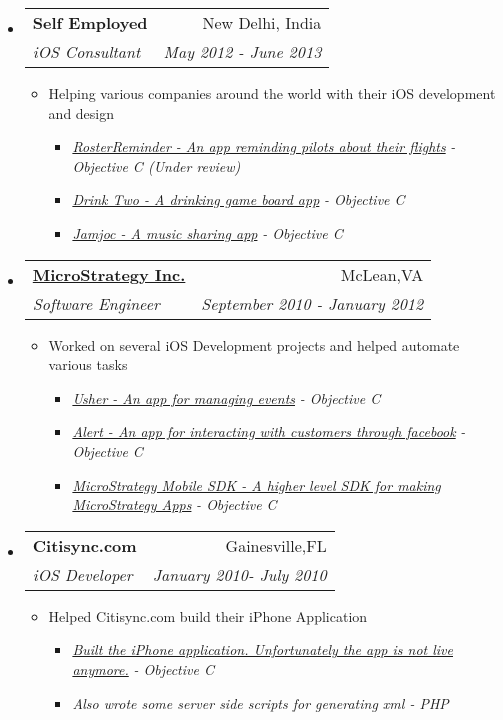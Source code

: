 \documentclass[letterpaper,11pt]{article}
\makeatletter
\newcommand{\resitem}[1]{\item #1 \vspace{-2pt}}
\newcommand{\ressubheading}[4]{
\begin{tabular*}{7.0in}{l@{\extracolsep{\fill}}r}
		\textbf{#1} & #2 \\
		\textit{#3} & \textit{#4} \\
\end{tabular*}\vspace{-6pt}}
\makeatother
\begin{document}
\begin{itemize}
\item
    \ressubheading{{Self Employed}}{New Delhi, India}{iOS Consultant}{May 2012 - June 2013}
    \begin{itemize}
        \resitem{Helping various companies around the world with their iOS development and design}
        \begin{itemize}
           \resitem{\href{https://itunes.apple.com/us/app/sg-pilots-roster-reminder/id561001503}{\emph{RosterReminder - An app reminding pilots about their flights}}\emph{ - Objective C (Under review)}}
            \resitem{\href{https://itunes.apple.com/tr/app/drink-two-college-party-drinking/id590014833?mt=8}{\emph{Drink Two - A drinking game board app}}\emph{ - Objective C }}
            \resitem{\href{https://itunes.apple.com/us/app/earhead/id585869906?mt=8}{\emph{Jamjoc - A music sharing app}}\emph{ - Objective C }}
        \end{itemize}
    \end{itemize}

\vspace{0.3in}

\item
    \ressubheading{\href{http://www.microstrategy.com/Company}{MicroStrategy Inc.}}{McLean,VA}{Software Engineer}{September 2010 - January 2012}
    \begin{itemize}
        \resitem{Worked on several iOS Development projects and helped automate various tasks}
        \begin{itemize}
            \resitem{\href{http://itunes.apple.com/us/app/usher-by-microstrategy/id477543403}{\emph{Usher - An app for managing events}}\emph{ - Objective C}}
             \resitem{\href{http://itunes.apple.com/us/app/alert-for-iphone/id442981988?mt=8&ls=1}{\emph{Alert - An app for interacting with customers through facebook}}\emph{ - Objective C}}
               \resitem{ \href{http://www.microstrategy.com/mobile/}{\emph{MicroStrategy Mobile SDK - A higher level SDK for making MicroStrategy Apps}}\emph{ - Objective C}}
        \end{itemize}
    \end{itemize}

\item
    \ressubheading{Citisync.com}{Gainesville,FL}{iOS Developer}{January 2010- July 2010}
    \begin{itemize}
        \resitem{Helped Citisync.com build their iPhone Application}
        \begin{itemize}
            \resitem{\href{http://www.alligator.org/news/campus/article_8fe50876-c78b-11df-96a3-001cc4c03286.html}{\emph{Built the iPhone application. Unfortunately the app is not live anymore.}}\emph{ - Objective C}}
           \resitem{\emph{Also wrote some server side scripts for generating xml - PHP}}
        \end{itemize}
    \end{itemize}


\end{itemize}
\end{document}
